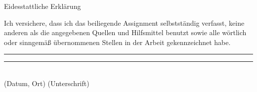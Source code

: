 \documentclass[a4paper,12pt]{article}
\begin{document}
\begin{center}
{\Large Eidesstattliche Erklärung}
\vspace*{4cm}\end{center}
\noindent
Ich versichere, dass ich das beiliegende Assignment selbstständig verfasst, keine anderen als die angegebenen Quellen und Hilfsmittel benutzt sowie alle wörtlich oder sinngemäß übernommenen Stellen in der Arbeit gekennzeichnet habe. 
\vspace{3cm}

\hspace{-0.8cm}
\rule[0.5ex]{6.5cm}{1pt}
\hspace{1.3cm}
\rule[0.5ex]{6.5cm}{1pt}
\\(Datum, Ort)
\hspace{6.3cm}
(Unterschrift)
\end{document}
